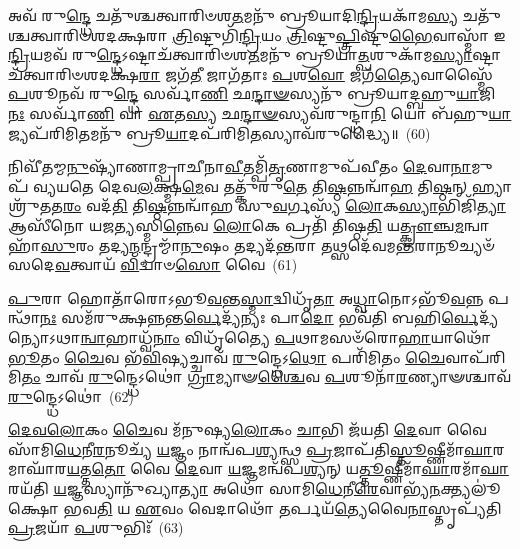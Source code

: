 𑌅𑌵᳴ 𑌰𑍁\-\ul{𑌨𑍍𑌦𑍍𑌧𑍇} 𑌚𑌤𑍁᳴𑌶𑍍𑌚𑌤𑍍𑌵𑌾𑌰𑌿𑍞𑌶\-\ul{𑌤}\-𑌮𑌨𑍁᳴ 𑌬𑍍𑌰𑍂𑌯𑌾𑌦𑌿\-\ul{𑌨𑍍𑌦𑍍𑌰𑌿}\-𑌯𑌕𑌾᳴𑌮\-\ul{𑌸𑍍𑌯} 𑌚𑌤𑍁᳴𑌶𑍍𑌚𑌤𑍍𑌵𑌾𑌰𑌿𑍞𑌶𑌦𑌕𑍍𑌷𑌰𑌾 \ul{𑌤𑍍𑌰𑌿}\-𑌷𑍍𑌟𑍁𑌗𑌿᳴\-\ul{𑌨𑍍𑌦𑍍𑌰𑌿}\-𑌯𑌂 \ul{𑌤𑍍𑌰𑌿}\-𑌷𑍍𑌟𑍁\-\ul{𑌪𑍍𑌤𑍍𑌰𑌿}\-𑌷𑍍𑌟𑍁\-\ul{𑌭𑍈}\-𑌵𑌾𑌸𑍍𑌮𑌾᳴ 𑌇\-\ul{𑌨𑍍𑌦𑍍𑌰𑌿}\-𑌯𑌮𑌵᳴ 𑌰𑍁\-\ul{𑌨𑍍𑌦𑍍𑌧𑍇}\-\-𑌽𑌷𑍍𑌟𑌾𑌚᳴𑌤𑍍𑌵𑌾𑌰𑌿𑍞𑌶\-\ul{𑌤}\-𑌮𑌨𑍁᳴ 𑌬𑍍𑌰𑍂𑌯𑌾\-\ul{𑌤𑍍𑌪}\-𑌶𑍁𑌕𑌾᳴𑌮\-\ul{𑌸𑍍𑌯𑌾}\-𑌷𑍍𑌟𑌾𑌚᳴𑌤𑍍𑌵𑌾𑌰𑌿𑍞𑌶𑌦𑌕𑍍𑌷\-\ul{𑌰𑌾} 𑌜𑌗᳴\-\ul{𑌤𑍀} 𑌜𑌾𑌗᳴𑌤𑌾𑌃 \ul{𑌪}\-𑌶\-\ul{𑌵𑍋} 𑌜𑌗᳴\-\ul{𑌤𑍍𑌯𑍈}\-𑌵𑌾𑌸𑍍𑌮𑍈᳴ \ul{𑌪}\-𑌶𑍂𑌨𑌵᳴ 𑌰𑍁\-\ul{𑌨𑍍𑌦𑍍𑌧𑍇} 𑌸𑌰𑍍𑌵𑌾᳴\-\ul{𑌣𑌿} 𑌛\-\ul{𑌨𑍍𑌦𑌾}\-\-\ul{𑍟}\-𑌸𑍍𑌯𑌨𑍁᳴ 𑌬𑍍𑌰𑍂𑌯𑌾𑌦𑍍𑌬𑌹𑍁\-\ul{𑌯𑌾}\-𑌜𑌿\-\ul{𑌨𑌃} 𑌸𑌰𑍍𑌵𑌾᳴\-\ul{𑌣𑌿} 𑌵𑌾 \ul{𑌏}\-𑌤\-\ul{𑌸𑍍𑌯} 𑌛\-\ul{𑌨𑍍𑌦𑌾}\-\-\ul{𑍟}\-𑌸𑍍𑌯𑌵᳴𑌰𑍁𑌨𑍍𑌦𑍍𑌧𑌾\-\ul{𑌨𑌿} 𑌯𑍋 𑌬᳴𑌹𑍁\-\ul{𑌯𑌾}\-𑌜𑍍𑌯𑌪᳴𑌰𑌿𑌮𑌿\-\ul{𑌤}\-𑌮𑌨𑍁᳴ 𑌬𑍍𑌰𑍂\-\ul{𑌯𑌾}\-𑌦𑌪᳴𑌰𑌿𑌮𑌿\-\ul{𑌤}\-𑌸𑍍𑌯𑌾𑌵᳴𑌰𑍁𑌦𑍍𑌧𑍍𑌯𑍈॥~(60)

{\anuvakamend[{\-\ul{𑌕𑌾}\-𑌮𑌯𑍇᳴\-\ul{𑌤} 𑌪𑍍𑌰𑌤𑌿᳴𑌷𑍍𑌠𑌿𑌤𑍍𑌯𑍈 \ul{𑌪}\-𑌶𑍂\-\ul{𑌨𑍍𑌥𑍍𑌸}\-𑌪𑍍𑌤𑌚᳴𑌤𑍍𑌵𑌾𑌰𑌿𑍞𑌶𑌚𑍍𑌚}]}%

𑌨𑌿𑌵𑍀᳴𑌤𑌮𑍍𑌮\-\ul{𑌨𑍁}\-𑌷𑍍𑌯𑌾᳴𑌣𑌾𑌮𑍍𑌪𑍍𑌰𑌾𑌚𑍀𑌨𑌾\-\ul{𑌵𑍀}\-𑌤𑌮𑍍𑌪𑌿᳴\-\ul{𑌤𑍃}\-𑌣𑌾𑌮𑍁𑌪᳴𑌵𑍀𑌤𑌂 \ul{𑌦𑍇}\-𑌵𑌾\-\ul{𑌨𑌾}\-𑌮𑍁𑌪᳴ 𑌵𑍍𑌯𑌯𑌤𑍇 𑌦𑍇𑌵\-\ul{𑌲}\-𑌕𑍍𑌷𑍍𑌮\-\ul{𑌮𑍇}\-𑌵 𑌤𑌤𑍍𑌕𑍁᳴𑌰𑍁\-\ul{𑌤𑍇} 𑌤𑌿\-\ul{𑌷𑍍𑌠}\-𑌨𑍍𑌨𑌨𑍍𑌵𑌾᳴\-\ul{𑌹} 𑌤𑌿\-\ul{𑌷𑍍𑌠}\-𑌨𑍍 𑌹𑍍𑌯𑌾𑌶𑍍𑌰𑍁᳴𑌤𑌤\-\ul{𑌰𑌂} 𑌵𑌦᳴\-\ul{𑌤𑌿} 𑌤𑌿\-\ul{𑌷𑍍𑌠}\-𑌨𑍍𑌨𑌨𑍍𑌵𑌾᳴𑌹 𑌸𑍁\-\ul{𑌵}\-𑌰𑍍𑌗𑌸𑍍𑌯᳴ \ul{𑌲𑍋}\-𑌕\-\ul{𑌸𑍍𑌯𑌾}\-𑌭𑌿𑌜𑌿᳴\-\ul{𑌤𑍍𑌯𑌾} 𑌆𑌸𑍀᳴𑌨𑍋 𑌯𑌜\-\ul{𑌤𑍍𑌯}\-𑌸𑍍𑌮𑌿\-\ul{𑌨𑍍𑌨𑍇}\-𑌵 \ul{𑌲𑍋}\-𑌕𑍇 𑌪𑍍𑌰𑌤𑌿᳴ 𑌤𑌿𑌷𑍍𑌠\-\ul{𑌤𑌿} 𑌯\-\ul{𑌤𑍍𑌕𑍍𑌰𑍗}\-𑌞𑍍𑌚\-\ul{𑌮}\-𑌨𑍍𑌵𑌾𑌹𑌾᳴\-\ul{𑌸𑍁}\-𑌰𑌂 𑌤𑌦𑍍𑌯\-\ul{𑌨𑍍𑌮}\-𑌨𑍍𑌦𑍍𑌰𑌮𑍍𑌮𑌾᳴\-\ul{𑌨𑍁}\-𑌷𑌂 𑌤𑌦𑍍𑌯𑌦᳴\-\ul{𑌨𑍍𑌤}\-𑌰𑌾 𑌤𑌥𑍍𑌸𑌦𑍇᳴𑌵𑌮\-\ul{𑌨𑍍𑌤}\-𑌰𑌾𑌨𑍂𑌚𑍍𑌯𑍞᳴ 𑌸𑌦𑍇\-\ul{𑌵}\-𑌤𑍍𑌵𑌾𑌯᳴ \ul{𑌵𑌿}\-𑌦𑍍𑌵𑌾𑍞\-\ul{𑌸𑍋} 𑌵𑍈~(61)

\-\ul{𑌪𑍁}\-𑌰𑌾 𑌹𑍋𑌤𑌾᳴𑌰𑍋\-𑌽𑌭𑍂\-\ul{𑌵}\-𑌨𑍍𑌤\-\ul{𑌸𑍍𑌮𑌾}\-𑌦𑍍𑌵𑌿𑌧𑍃᳴\-\ul{𑌤𑌾} 𑌅\-\ul{𑌧𑍍𑌵𑌾}\-𑌨𑍋\-𑌽𑌭𑍂᳴\-\ul{𑌵}\-𑌨𑍍𑌨 𑌪𑌨𑍍𑌥𑌾᳴\-\ul{𑌨𑌃} 𑌸𑌮᳴𑌰𑍁𑌕𑍍𑌷𑌨𑍍𑌨𑌨𑍍𑌤\-\ul{𑌰𑍍𑌵𑍇}\-𑌦𑍍𑌯᳴𑌨𑍍𑌯𑌃 𑌪𑌾\-\ul{𑌦𑍋} 𑌭𑌵᳴𑌤𑌿 𑌬𑌹𑌿\-\ul{𑌰𑍍𑌵𑍇}\-𑌦𑍍𑌯᳴𑌨𑍍𑌯𑍋\-𑌽𑌥𑌾\-\ul{𑌨𑍍𑌵𑌾}\-𑌹𑌾𑌧𑍍𑌵᳴\-\ul{𑌨𑌾𑌂} 𑌵𑌿𑌧𑍃᳴𑌤𑍍𑌯𑍈 \ul{𑌪}\-𑌥𑌾𑌮𑌸𑍞᳴𑌰𑍋\-\ul{𑌹𑌾}\-𑌯𑌾𑌥𑍋᳴ \ul{𑌭𑍂}\-𑌤𑌂 \ul{𑌚𑍈}\-𑌵 𑌭᳴\-\ul{𑌵𑌿}\-𑌷𑍍𑌯𑌚𑍍𑌚𑌾𑌵᳴ \ul{𑌰𑍁}\-𑌨𑍍𑌦𑍍𑌧𑍇\-𑌽\-\ul{𑌥𑍋} 𑌪𑌰𑌿᳴𑌮𑌿𑌤𑌂 \ul{𑌚𑍈}\-𑌵𑌾𑌪᳴𑌰𑌿𑌮𑌿\-\ul{𑌤𑌂} 𑌚𑌾𑌵᳴ \ul{𑌰𑍁}\-𑌨𑍍𑌦𑍍𑌧𑍇\-𑌽𑌥𑍋॑ \ul{𑌗𑍍𑌰𑌾}\-𑌮𑍍𑌯𑌾𑍟\-\ul{𑌶𑍍𑌚𑍈}\-𑌵 \ul{𑌪}\-𑌶𑍂𑌨𑌾᳴\-\ul{𑌰}\-𑌣𑍍𑌯𑌾𑍟𑌶𑍍𑌚𑌾𑌵᳴ \ul{𑌰𑍁}\-𑌨𑍍𑌦𑍍𑌧𑍇\-𑌽𑌥𑍋॑~(62)

\-\ul{𑌦𑍇}\-\-\ul{𑌵}\-\-\ul{𑌲𑍋}\-𑌕𑌂 \ul{𑌚𑍈}\-𑌵 𑌮᳴𑌨𑍁𑌷𑍍𑌯\-\ul{𑌲𑍋}\-𑌕𑌂 \ul{𑌚𑌾}\-𑌭𑌿 𑌜᳴𑌯𑌤𑌿 \ul{𑌦𑍇}\-𑌵𑌾 𑌵𑍈 𑌸𑌾᳴𑌮𑌿\-\ul{𑌧𑍇}\-𑌨𑍀\-\ul{𑌰}\-𑌨𑍂𑌚𑍍𑌯᳴ \ul{𑌯}\-𑌜𑍍𑌞𑌂 𑌨𑌾𑌨𑍍𑌵᳴𑌪\-\ul{𑌶𑍍𑌯}\-𑌨𑍍𑌥𑍍𑌸 \ul{𑌪𑍍𑌰}\-𑌜𑌾𑌪᳴𑌤𑌿\-\ul{𑌸𑍍𑌤𑍂}\-𑌷𑍍𑌣𑍀𑌮𑌾᳴\-\ul{𑌘𑌾}\-𑌰𑌮𑌾𑌘𑌾᳴𑌰\-\ul{𑌯}\-𑌤𑍍𑌤\-\ul{𑌤𑍋} 𑌵𑍈 \ul{𑌦𑍇}\-𑌵𑌾 \ul{𑌯}\-𑌜𑍍𑌞𑌮𑌨𑍍𑌵᳴𑌪\-\ul{𑌶𑍍𑌯}\-𑌨𑍍 𑌯\-\ul{𑌤𑍍𑌤𑍂}\-𑌷𑍍𑌣𑍀𑌮𑌾᳴\-\ul{𑌘𑌾}\-𑌰𑌮𑌾᳴\-\ul{𑌘𑌾}\-𑌰𑌯᳴𑌤𑌿 \ul{𑌯}\-𑌜𑍍𑌞𑌸𑍍𑌯𑌾𑌨𑍁᳴𑌖𑍍𑌯𑌾\-\ul{𑌤𑍍𑌯𑌾} 𑌅𑌥𑍋᳴ 𑌸𑌾𑌮𑌿\-\ul{𑌧𑍇}\-𑌨𑍀\-\ul{𑌰𑍇}\-𑌵𑌾𑌭𑍍𑌯᳴\-\ul{𑌨}\-𑌕𑍍𑌤𑍍𑌯𑌲𑍂॑𑌕𑍍𑌷𑍋 𑌭𑌵\-\ul{𑌤𑌿} 𑌯 \ul{𑌏}\-𑌵𑌂 𑌵𑍇𑌦𑌾𑌥𑍋᳴ \ul{𑌤}\-𑌰𑍍𑌪𑌯᳴\-\ul{𑌤𑍍𑌯𑍇}\-𑌵𑍈\-\ul{𑌨𑌾}\-𑌸𑍍𑌤𑍃𑌪𑍍𑌯᳴𑌤𑌿 \ul{𑌪𑍍𑌰}\-𑌜𑌯𑌾᳴ \ul{𑌪}\-𑌶𑍁𑌭𑌿𑌃᳴~(63)

